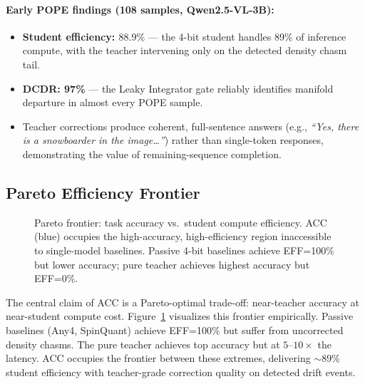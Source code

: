 \documentclass[runningheads]{llncs}
\begin{document}
\paragraph{Early POPE findings (108 samples, Qwen2.5-VL-3B):}
\begin{itemize}[itemsep=0pt]
  \item \textbf{Student efficiency: $88.9\%$} --- the 4-bit student handles
    89\% of inference compute, with the teacher intervening only on the
    detected density chasm tail.
  \item \textbf{DCDR: 97\%} --- the Leaky Integrator gate reliably identifies
    manifold departure in almost every POPE sample.
  \item Teacher corrections produce coherent, full-sentence answers
    (e.g., \textit{``Yes, there is a snowboarder in the image\ldots''})
    rather than single-token responses, demonstrating the value of
    remaining-sequence completion.
\end{itemize}

\subsection{Pareto Efficiency Frontier}

\begin{figure}[t]
  \centering
  \caption{Pareto frontier: task accuracy vs.\ student compute efficiency.
  ACC (blue) occupies the high-accuracy, high-efficiency region inaccessible
  to single-model baselines. Passive 4-bit baselines achieve EFF=100\% but
  lower accuracy; pure teacher achieves highest accuracy but EFF=0\%.}
  \label{fig:pareto}
\end{figure}

The central claim of ACC is a Pareto-optimal trade-off: near-teacher accuracy
at near-student compute cost. Figure~\ref{fig:pareto} visualizes this frontier
empirically. Passive baselines (Any4, SpinQuant) achieve EFF=100\% but suffer
from uncorrected density chasms. The pure teacher achieves top accuracy but
at $5$--$10\times$ the latency. ACC occupies the frontier between these
extremes, delivering $\sim 89\%$ student efficiency with teacher-grade
correction quality on detected drift events.
\end{document}
